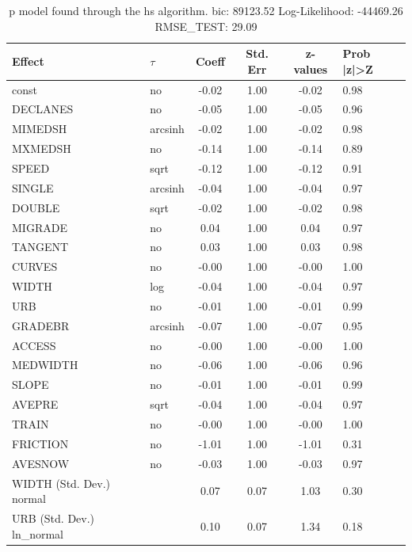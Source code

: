\begin{table}
	\caption{p model found through the hs algorithm. bic: 89123.52 Log-Likelihood: -44469.26 RMSE_TEST: 29.09}
	\begin{center}
		\begin{tabular}{|l|l|c|c|c|l|}
			\hline
			Effect & $\tau$ & Coeff & Std. Err & z-values & Prob |z|>Z \\
			\hline
			const & no & -0.02 & 1.00 & -0.02 & 0.98 \\
			\hline
			DECLANES & no & -0.05 & 1.00 & -0.05 & 0.96 \\
			\hline
			MIMEDSH & arcsinh & -0.02 & 1.00 & -0.02 & 0.98 \\
			\hline
			MXMEDSH & no & -0.14 & 1.00 & -0.14 & 0.89 \\
			\hline
			SPEED & sqrt & -0.12 & 1.00 & -0.12 & 0.91 \\
			\hline
			SINGLE & arcsinh & -0.04 & 1.00 & -0.04 & 0.97 \\
			\hline
			DOUBLE & sqrt & -0.02 & 1.00 & -0.02 & 0.98 \\
			\hline
			MIGRADE & no & 0.04 & 1.00 & 0.04 & 0.97 \\
			\hline
			TANGENT & no & 0.03 & 1.00 & 0.03 & 0.98 \\
			\hline
			CURVES & no & -0.00 & 1.00 & -0.00 & 1.00 \\
			\hline
			WIDTH & log & -0.04 & 1.00 & -0.04 & 0.97 \\
			\hline
			URB & no & -0.01 & 1.00 & -0.01 & 0.99 \\
			\hline
			GRADEBR & arcsinh & -0.07 & 1.00 & -0.07 & 0.95 \\
			\hline
			ACCESS & no & -0.00 & 1.00 & -0.00 & 1.00 \\
			\hline
			MEDWIDTH & no & -0.06 & 1.00 & -0.06 & 0.96 \\
			\hline
			SLOPE & no & -0.01 & 1.00 & -0.01 & 0.99 \\
			\hline
			AVEPRE & sqrt & -0.04 & 1.00 & -0.04 & 0.97 \\
			\hline
			TRAIN & no & -0.00 & 1.00 & -0.00 & 1.00 \\
			\hline
			FRICTION & no & -1.01 & 1.00 & -1.01 & 0.31 \\
			\hline
			AVESNOW & no & -0.03 & 1.00 & -0.03 & 0.97 \\
			\hline
			WIDTH (Std. Dev.) normal &  & 0.07 & 0.07 & 1.03 & 0.30 \\
			\hline
			URB (Std. Dev.) ln_normal &  & 0.10 & 0.07 & 1.34 & 0.18 \\

\end{tabular}
\end{center}
\end{table}
